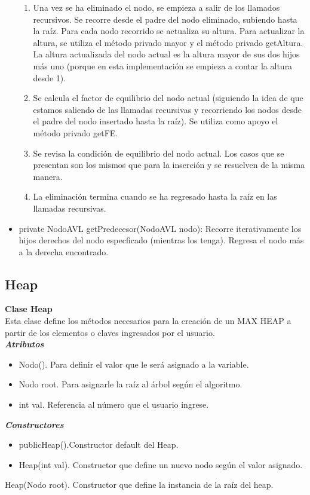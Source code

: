 \documentclass{article}
\begin{document}
\begin{itemize}
\begin{enumerate}
\item Una vez se ha eliminado el nodo, se empieza a salir de los llamados recursivos. Se recorre desde el padre del nodo eliminado, subiendo hasta la raíz. Para cada nodo recorrido se actualiza su altura. Para actualizar la altura, se utiliza el método privado mayor y el método privado getAltura. La altura actualizada del nodo actual es la altura mayor de sus dos hijos más uno (porque en esta implementación se empieza a contar la altura desde 1).
\item Se calcula el factor de equilibrio del nodo actual (siguiendo la idea de que estamos saliendo de las llamadas recursivas y recorriendo los nodos desde el padre del nodo insertado hasta la raíz). Se utiliza como apoyo el método privado getFE.
\item Se revisa la condición de equilibrio del nodo actual.  Los casos que se presentan son los mismos que para la inserción y se resuelven de la misma manera.
\item La eliminación termina cuando se ha regresado hasta la raíz en las llamadas recursivas.
\end{enumerate}
\item private NodoAVL getPredecesor(NodoAVL nodo): Recorre iterativamente los hijos derechos del nodo especficado (mientras los tenga). Regresa el nodo más a la derecha encontrado.
\end{itemize}
\newpage
\subsection{Heap}
\vspace{5mm} %

\textbf{Clase Heap}\\

Esta clase define los métodos necesarios para la creación de un MAX HEAP a partir de los 
 elementos o claves ingresados por el usuario.\\

\textit{\textbf{Atributos}}
\begin{itemize}
\item Nodo(). Para definir el valor que le será asignado a la variable.
\item Nodo root. Para asignarle la raíz al árbol según el algoritmo.
\item int val. Referencia al número que el usuario ingrese.
\end{itemize}

\textit{\textbf{Constructores}}
\begin{itemize}
    \item publicHeap().Constructor default del Heap.
    \item Heap(int val). Constructor que define un nuevo nodo según el valor asignado.
\end{itemize}Heap(Nodo root). Constructor que define la instancia de la raíz del heap.
\end{document}
